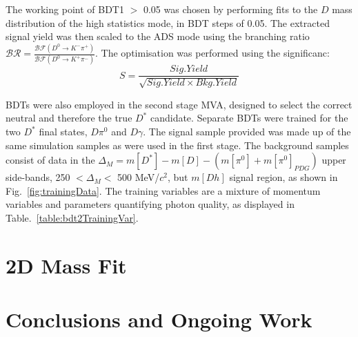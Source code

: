 \documentclass[oneside,12pt]{article}
\begin{document}
The working point of BDT1 $>$ 0.05 was chosen by performing fits to the $D$ mass
distribution of the high statistics mode, in BDT steps of 0.05. The extracted
signal yield was then scaled to the ADS mode using the branching ratio
$\mathcal{BR} = \frac{\mathcal{BF}(D^0 \rightarrow K^- \pi^+)}{\mathcal{BF}(D^0
\rightarrow K^+ \pi^-)}$. The optimisation was performed using the
significanc:
\begin{equation}
S = \frac{Sig. Yield}{\sqrt{Sig. Yield \times Bkg. Yield}}
\label{D_branching_ratio}
\end{equation}

BDTs were also employed in the second stage MVA, designed to select the correct
neutral and therefore the true $D^*$ candidate. Separate BDTs were trained for
the two $D^*$ final states, $D\pi^0$ and $D\gamma$. The signal sample provided
was made up of the same simulation samples as were used in the first stage. The
background samples consist of data in the $\Delta_M=m[D^{*}] - m[D]- (m[\pi^0]
+ m[\pi^0]_{PDG})$ upper side-bands, 250 $ < \Delta_{M} < $ 500 MeV/$c^2$, but
$m[Dh]$ signal region, as shown in Fig.~\ref{fig:trainingData}. The training
variables are a mixture of momentum variables and parameters quantifying photon
quality, as displayed in Table.~\ref{table:bdt2TrainingVar}. 



\section{2D Mass Fit} \label{massfit}
\section{Conclusions and Ongoing Work} \label{conclusion}

\printbibliography[heading=bibintoc,{title=References}]
\end{document}

